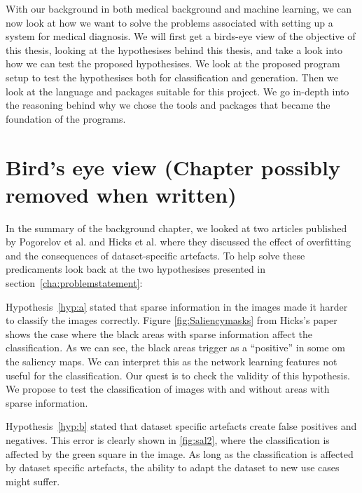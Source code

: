 With our background in both medical background and machine learning, we can now look at how we want to solve the problems associated with setting up a system for medical diagnosis.  
We will first get a birds-eye view of the objective of this thesis, looking at the hypothesises behind this thesis, and take a look into how we can test the proposed hypothesises. We look at the proposed program setup to test the hypothesises both for classification and generation.
Then we look at the language and packages suitable for this project. We go in-depth into the reasoning behind why we chose the tools and packages that became the foundation of the programs. 



\section{ Bird's eye view (Chapter possibly removed when written)}
\label{cha:BEW}
In the summary of the background chapter, we looked at two articles published by Pogorelov et al. and Hicks et al. where they discussed the effect of overfitting and the consequences of dataset-specific artefacts.
To help solve these predicaments look back at the two hypothesises presented in section~\ref{cha:problemstatement}:

\vspace{2px}
Hypothesis~\ref{hyp:a} stated that sparse information in the images made it harder to classify the images correctly. Figure \ref{fig:Saliencymasks} from Hicks's paper shows the case where the black areas with sparse information affect the classification. As we can see, the black areas trigger as a ``positive'' in some om the saliency maps. We can interpret this as the network learning features not useful for the classification. 
Our quest is to check the validity of this hypothesis. We propose to test the classification of images with and without areas with sparse information.


\vspace{5px}
Hypothesis~\ref{hyp:b} stated that dataset specific artefacts create false positives and negatives. This error is clearly shown in \ref{fig:sal2}, where the classification is affected by the green square in the image. 
As long as the classification is affected by dataset specific artefacts, the ability to adapt the dataset to new use cases might suffer.  


